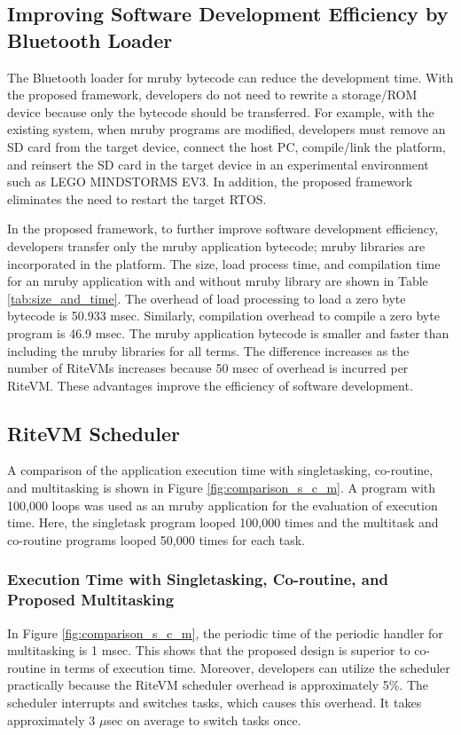 \documentclass[S,R,E]{article/compsoft}
\begin{document}
\subsection{Improving Software Development Efficiency by Bluetooth Loader}
The Bluetooth loader for mruby bytecode can reduce the development time.
With the proposed framework, developers do not need to rewrite a storage/ROM device because only the bytecode should be transferred.
For example, with the existing system, when mruby programs are modified, developers must remove an SD card from the target device, connect the host PC, compile/link the platform, and reinsert the SD card in the target device in an experimental environment such as LEGO MINDSTORMS EV3.
In addition, the proposed framework eliminates the need to restart the target RTOS.

In the proposed framework, to further improve software development efficiency, developers transfer only the mruby application bytecode; mruby libraries are incorporated in the platform.
The size, load process time, and compilation time for an mruby application with and without mruby library are shown in Table \ref{tab:size_and_time}.
The overhead of load processing to load a zero byte bytecode is 50.933 msec.
Similarly, compilation overhead to compile a zero byte program is 46.9 msec.
The mruby application bytecode is smaller and faster than including the mruby libraries for all terms.
The difference increases as the number of RiteVMs increases because 50 msec of overhead is incurred per RiteVM. 
These advantages improve the efficiency of software development.


\subsection{RiteVM Scheduler}
A comparison of the application execution time with singletasking, co-routine, and multitasking is shown in Figure \ref{fig:comparison_s_c_m}.
A program with 100,000 loops was used as an mruby application for the evaluation of execution time.
Here, the singletask program looped 100,000 times and the multitask and co-routine programs looped 50,000 times for each task.


\subsubsection{Execution Time with Singletasking, Co-routine, and Proposed Multitasking}
In Figure \ref{fig:comparison_s_c_m}, the periodic time of the periodic handler for multitasking is 1 msec.
This shows that the proposed design is superior to co-routine in terms of execution time.
Moreover, developers can utilize the scheduler practically because the RiteVM scheduler overhead is approximately 5\%.
The scheduler interrupts and switches tasks, which causes this overhead.
It takes approximately 3 $\mu$sec on average to switch tasks once.
\end{document}
